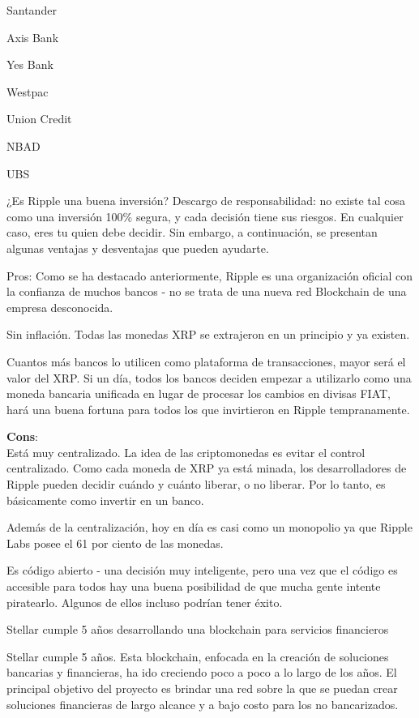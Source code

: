 \documentclass[a4paper,12pt]{/home/armando/Documentos/Cursos/LaTeX/Plantillas/lib/pub}
\begin{document}
	Santander
	
	Axis Bank
	
	Yes Bank
	
	Westpac
	
	Union Credit
	
	NBAD
	
	UBS
	
	¿Es Ripple una buena inversión?
	Descargo de responsabilidad: no existe tal cosa como una inversión 100\% segura, y cada decisión tiene sus riesgos. En cualquier caso, eres tu quien debe decidir. Sin embargo, a continuación, se presentan algunas ventajas y desventajas que pueden ayudarte.
	
	Pros:
	Como se ha destacado anteriormente, Ripple es una organización oficial con la confianza de muchos bancos - no se trata de una nueva red Blockchain de una empresa desconocida.
	
	Sin inflación. Todas las monedas XRP se extrajeron en un principio y ya existen.
	
	Cuantos más bancos lo utilicen como plataforma de transacciones, mayor será el valor del XRP. Si un día, todos los bancos deciden empezar a utilizarlo como una moneda bancaria unificada en lugar de procesar los cambios en divisas FIAT, hará una buena fortuna para todos los que invirtieron en Ripple tempranamente.
	
	\textbf{Cons}:\\
	Está muy centralizado. La idea de las criptomonedas es evitar el control centralizado. Como cada moneda de XRP ya está minada, los desarrolladores de Ripple pueden decidir cuándo y cuánto liberar, o no liberar. Por lo tanto, es básicamente como invertir en un banco.
	
	Además de la centralización, hoy en día es casi como un monopolio ya que Ripple Labs posee el 61 por ciento de las monedas.
	
	Es código abierto - una decisión muy inteligente, pero una vez que el código es accesible para todos hay una buena posibilidad de que mucha gente intente piratearlo. Algunos de ellos incluso podrían tener éxito.
	
	Stellar cumple 5 años desarrollando una blockchain para servicios financieros
	
	Stellar cumple 5 años. Esta blockchain, enfocada en la creación de soluciones bancarias y financieras, ha ido creciendo poco a poco a lo largo de los años. El principal objetivo del proyecto es brindar una red sobre la que se puedan crear soluciones financieras de largo alcance y a bajo costo para los no bancarizados.
	
\end{document}
